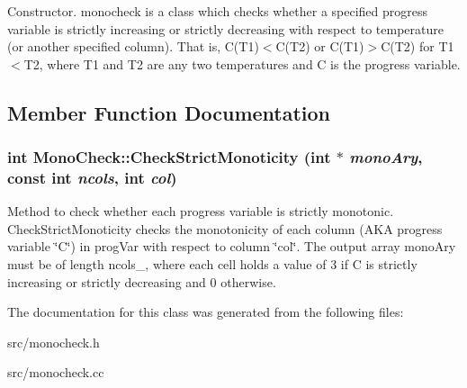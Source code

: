 Constructor. monocheck is a class which checks whether a specified progress variable is strictly increasing or strictly decreasing with respect to temperature (or another specified column). That is, C(T1)$<$C(T2) or C(T1)$>$C(T2) for T1$<$T2, where T1 and T2 are any two temperatures and C is the progress variable. 

\subsection{Member Function Documentation}
\hypertarget{classMonoCheck_af34f3d72ec2d1575526d42bfe4cdfe7a}{
\subsubsection[{CheckStrictMonoticity}]{\setlength{\rightskip}{0pt plus 5cm}int MonoCheck::CheckStrictMonoticity (int $\ast$ {\em monoAry}, \/  const int {\em ncols}, \/  int {\em col})}}
\label{d8/ddf/classMonoCheck_af34f3d72ec2d1575526d42bfe4cdfe7a}


Method to check whether each progress variable is strictly monotonic. CheckStrictMonoticity checks the monotonicity of each column (AKA progress variable \char`\"{}C\char`\"{}) in progVar with respect to column \char`\"{}col\char`\"{}. The output array monoAry must be of length ncols\_\-, where each cell holds a value of 3 if C is strictly increasing or strictly decreasing and 0 otherwise. 

The documentation for this class was generated from the following files:\begin{DoxyCompactItemize}
\item 
src/monocheck.h\item 
src/monocheck.cc\end{DoxyCompactItemize}
